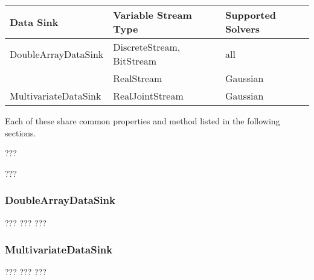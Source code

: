 \begin{longtable} {l | l | l}
Data Sink & Variable Stream Type & Supported Solvers \\
\hline
\endhead
DoubleArrayDataSink & DiscreteStream, BitStream & all \\
 & RealStream & Gaussian \\
MultivariateDataSink & RealJointStream & Gaussian \\
\end{longtable} 

Each of these share common properties and method listed in the following sections.


???

???


\subsubsection{DoubleArrayDataSink}
???
???
???

\subsubsection{MultivariateDataSink}
???
???
???



